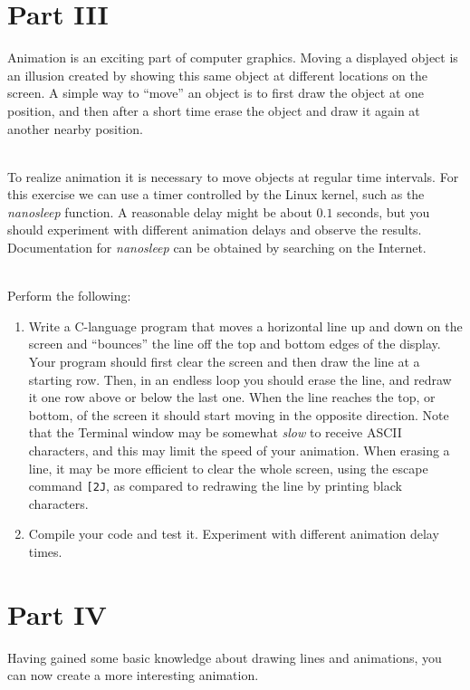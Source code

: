 \documentclass[epsfig,10pt,fullpage]{article}
\begin{document}
\noindent
\section*{Part III}

\noindent
Animation is an exciting part of computer graphics. Moving a displayed object is an illusion 
created by showing this same object at different locations on the screen. A simple way to
``move'' an object is to first draw the object at one position, and then after a short time erase 
the object and draw it again at another nearby position.

~\\
\noindent
To realize animation it is necessary to move objects at regular time intervals. For this
exercise we can use a timer controlled by the Linux kernel, such as the {\it nanosleep}
function. A reasonable delay might be about $0.1$ seconds, but you should experiment with 
different animation delays and observe the results. Documentation for {\it nanosleep} can be 
obtained by searching on the Internet.

~\\
\noindent
Perform the following:

\begin{enumerate}

\item Write a C-language program that moves a horizontal line up and down on the screen and 
``bounces'' the line off the top and bottom edges of the display. Your program should first 
clear the screen and then draw the line at a starting row. Then, in an endless loop you should
erase the line, and redraw it one row above or below the last one. When the line reaches the 
top, or bottom, of the screen it should start moving in the opposite direction. Note that
the Terminal window may be somewhat {\it slow} to receive ASCII characters, and this may
limit the speed of your animation. When erasing a line, it may be more efficient to clear the
whole screen, using the escape command \texttt{[2J}, as compared to redrawing the line by
printing black characters.

\item Compile your code and test it. Experiment with different animation delay times.
\end{enumerate}
\noindent
\section*{Part IV}

\noindent
Having gained some basic knowledge about drawing lines and animations, you can now create 
a more interesting animation.
\end{document}
